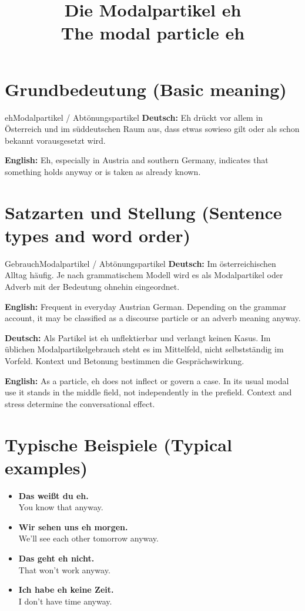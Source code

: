 \documentclass[a4paper,11pt]{article}
\title{Die Modalpartikel \glqq eh\grqq\\{\large\textnormal{The modal particle eh}}}
\date{}
\newcommand{\GermanText}[1]{\textbf{Deutsch: }#1\par}
\newcommand{\EnglishText}[1]{{\small\color{SoftGray}\textbf{English: }#1\par}}
\newcommand{\ExampleItem}[2]{\item \textbf{#1}\\{\small\color{SoftGray}#2}}
\begin{document}
\maketitle
\tableofcontents
\section{Grundbedeutung \textnormal{(Basic meaning)}}
\begin{grammarentry}{eh}{Modalpartikel / Abtönungspartikel}
\GermanText{Eh drückt vor allem in Österreich und im süddeutschen Raum aus, dass etwas sowieso gilt oder als schon bekannt vorausgesetzt wird.}
\EnglishText{Eh, especially in Austria and southern Germany, indicates that something holds anyway or is taken as already known.}
\end{grammarentry}
\section{Satzarten und Stellung \textnormal{(Sentence types and word order)}}
\begin{grammarentry}{Gebrauch}{Modalpartikel / Abtönungspartikel}
\GermanText{Im österreichischen Alltag häufig. Je nach grammatischem Modell wird es als Modalpartikel oder Adverb mit der Bedeutung ohnehin eingeordnet.}
\EnglishText{Frequent in everyday Austrian German. Depending on the grammar account, it may be classified as a discourse particle or an adverb meaning anyway.}
\end{grammarentry}
\GermanText{Als Partikel ist eh unflektierbar und verlangt keinen Kasus. Im üblichen Modalpartikelgebrauch steht es im Mittelfeld, nicht selbstständig im Vorfeld. Kontext und Betonung bestimmen die Gesprächswirkung.}
\EnglishText{As a particle, eh does not inflect or govern a case. In its usual modal use it stands in the middle field, not independently in the prefield. Context and stress determine the conversational effect.}
\section{Typische Beispiele \textnormal{(Typical examples)}}
\begin{exbox}\begin{itemize}
\ExampleItem{Das weißt du eh.}{You know that anyway.}
\ExampleItem{Wir sehen uns eh morgen.}{We'll see each other tomorrow anyway.}
\ExampleItem{Das geht eh nicht.}{That won't work anyway.}
\ExampleItem{Ich habe eh keine Zeit.}{I don't have time anyway.}
\end{itemize}\end{exbox}
\end{document}
